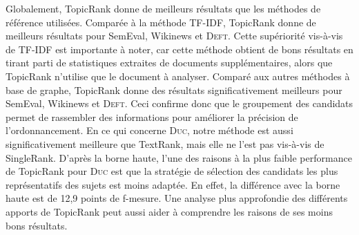         Globalement, TopicRank donne de meilleurs résultats que les méthodes de
        référence utilisées.
        Comparée à la méthode TF-IDF, TopicRank donne de meilleurs résultats pour
        SemEval, Wikinews et \textsc{Deft}. Cette supériorité vis-à-vis de TF-IDF est
        importante à noter, car cette méthode obtient de bons résultats en
        tirant parti de statistiques extraites de documents supplémentaires,
        alors que TopicRank n'utilise que le document à analyser. Comparé aux
        autres méthodes à base de graphe, TopicRank donne des résultats
        significativement meilleurs pour SemEval, Wikinews et \textsc{Deft}. Ceci
        confirme donc que le groupement des candidats permet de rassembler des
        informations pour améliorer la précision de l'ordonnancement. En ce qui
        concerne \textsc{Duc}, notre méthode est aussi significativement meilleure que
        TextRank, mais elle ne l'est pas vis-à-vis de SingleRank. D'après la
        borne haute, l'une des raisons à la plus faible performance de TopicRank
        pour \textsc{Duc} est que la stratégie de sélection des candidats les plus
        représentatifs des sujets est moins adaptée. En effet, la différence
        avec la borne haute est de 12,9 points de f-mesure. Une analyse plus
        approfondie des différents apports de TopicRank peut aussi aider à
        comprendre les raisons de ses moins bons résultats.

